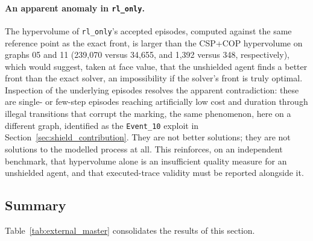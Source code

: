 \paragraph{An apparent anomaly in \texttt{rl\_only}.}
The hypervolume of \texttt{rl\_only}'s accepted episodes, computed
against the same reference point as the exact front, is larger than
the CSP+COP hypervolume on graphs 05 and 11 (239{,}070 versus 34{,}655,
and 1{,}392 versus 348, respectively), which would suggest, taken at
face value, that the unshielded agent finds a better front than the
exact solver, an impossibility if the solver's front is truly optimal.
Inspection of the underlying episodes resolves the apparent
contradiction: these are single- or few-step episodes reaching
artificially low cost and duration through illegal transitions that
corrupt the marking, the same phenomenon, here on a different graph,
identified as the \texttt{Event\_10} exploit in
Section~\ref{sec:shield_contribution}. They are not better solutions;
they are not solutions to the modelled process at all. This
reinforces, on an independent benchmark, that hypervolume alone is an
insufficient quality measure for an unshielded agent, and that
executed-trace validity must be reported alongside it.

\subsection{Summary}
\label{sec:external_summary}

Table~\ref{tab:external_master} consolidates the results of this
section.


